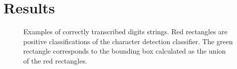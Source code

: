 \documentclass[11pt]{article}
\begin{document}
\section{Results}
\begin{figure}[ht]
    \centering
    \caption{Examples of correctly transcribed digits strings. Red rectangles are positive classifications of the
    character detection classifier. The green rectangle corresponds to the bounding box calculated as the union
    of the red rectangles.}
    \label{fig:good_examples_pipeline}
\end{figure}
\end{document}
